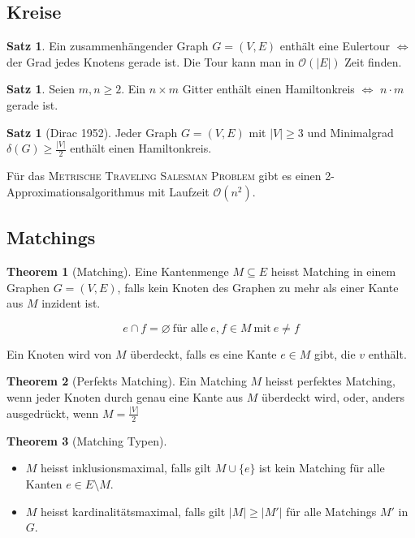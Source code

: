 \documentclass[a4paper, 10pt]{article}
\theoremstyle{definition}
\newtheorem{theorem}[definition]{Satz}
\theoremstyle{named}
\newtheorem*{ntheorem}{Theorem}
\newcommand{\BO}{\mathcal{O}}
\begin{document}
\subsection{Kreise}

\setcounter{definition}{30}
\begin{theorem}
    Ein zusammenhängender Graph $G = (V, E)$ enthält eine Eulertour $\iff$ der Grad jedes Knotens gerade ist. Die Tour kann man in $\BO(|E|)$ Zeit finden.
\end{theorem}

\begin{theorem}
    Seien $m, n \geq 2$. Ein $n \times m$ Gitter enthält einen Hamiltonkreis $\iff$ $n \cdot m$ gerade ist.
\end{theorem}

\setcounter{definition}{39}
\begin{theorem}[Dirac 1952]
    Jeder Graph $G = (V, E)$ mit $|V| \geq 3$ und Minimalgrad $\delta(G) \geq \frac{|V|}{2}$ enthält einen Hamiltonkreis.
\end{theorem}

\setcounter{definition}{42}
Für das \textsc{Metrische Traveling Salesman Problem} gibt es einen 2-Approximationsalgorithmus mit Laufzeit $\BO(n^2)$.

\subsection{Matchings}
\begin{ntheorem}[Matching]
    Eine Kantenmenge $M \subseteq E$ heisst Matching in einem Graphen $G = (V, E)$, falls kein Knoten des Graphen zu mehr als einer Kante aus $M$ inzident ist.

    $$e \cap f = \varnothing \ \text{für alle} \ e, f \in M \ \text{mit} \ e \neq f$$

    Ein Knoten wird von $M$ überdeckt, falls es eine Kante $e \in M$ gibt, die $v$ enthält.
\end{ntheorem}

\begin{ntheorem}[Perfekts Matching]
    Ein Matching $M$ heisst perfektes Matching, wenn jeder Knoten durch genau eine Kante aus $M$ überdeckt wird, oder, anders ausgedrückt, wenn $M = \frac{|V|}{2}$
\end{ntheorem}

\begin{ntheorem}[Matching Typen] \hfill
    \begin{itemize}
        \item $M$ heisst inklusionsmaximal, falls gilt $M \cup \{e\}$ ist kein Matching für alle Kanten $e \in E \setminus M$.
        \item $M$ heisst kardinalitätsmaximal, falls gilt $|M| \geq |M'|$ für alle Matchings $M'$ in $G$.
    \end{itemize}
\end{ntheorem}
\end{document}
